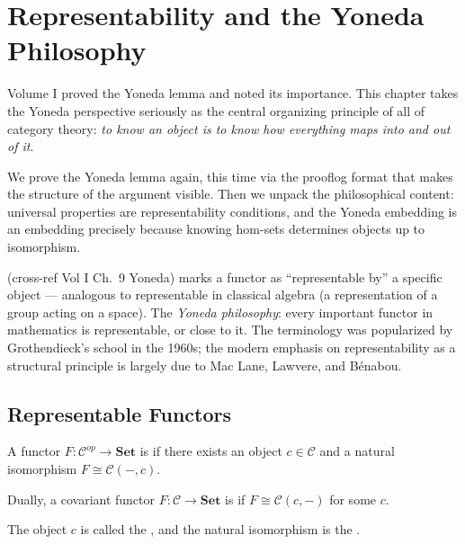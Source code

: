 
\chapter{Representability and the Yoneda Philosophy}

Volume I proved the Yoneda lemma and noted its importance. This chapter
takes the Yoneda perspective seriously as the central organizing principle
of all of category theory: \emph{to know an object is to know how everything
maps into and out of it}.

We prove the Yoneda lemma again, this time via the prooflog format that
makes the structure of the argument visible. Then we unpack the philosophical
content: universal properties are representability conditions, and the Yoneda
embedding is an embedding precisely because knowing hom-sets determines objects
up to isomorphism.

\begin{nameorigin}
 (cross-ref Vol I Ch.~9 Yoneda) marks a functor
as ``representable by'' a specific object — analogous to representable
in classical algebra (a representation of a group acting on a space).
The \emph{Yoneda philosophy}: every important functor in mathematics is
representable, or close to it. The terminology was popularized by
Grothendieck's school in the 1960s; the modern emphasis on
representability as a structural principle is largely due to Mac Lane,
Lawvere, and Bénabou.
\end{nameorigin}

\section{Representable Functors}

\begin{definition}
A functor $F : \mathcal{C}^{op} \to \mathbf{Set}$ is  if
there exists an object $c \in \mathcal{C}$ and a natural isomorphism
$F \cong \mathcal{C}(-, c)$.

Dually, a covariant functor $F : \mathcal{C} \to \mathbf{Set}$ is
 if $F \cong \mathcal{C}(c, -)$ for some $c$.

The object $c$ is called the , and the natural
isomorphism is the .
\end{definition}


